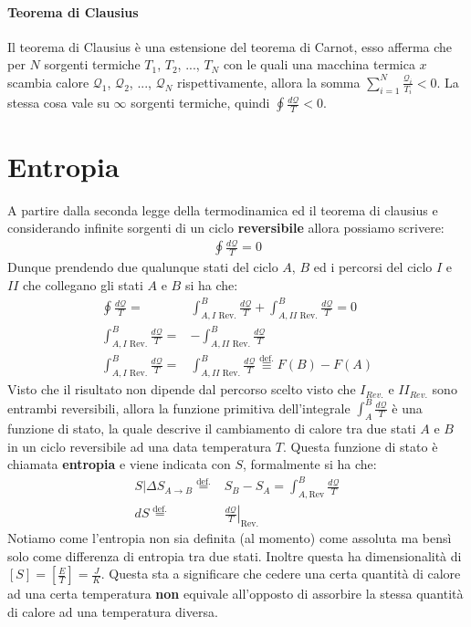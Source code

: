     \paragraph{Teorema di Clausius}
        Il teorema di Clausius è una estensione del teorema di Carnot, esso afferma che per $N$ sorgenti termiche $T_1$, $T_2$, ..., $T_N$ con le quali una macchina termica $x$ scambia calore $\mathcal{Q}_1$, $\mathcal{Q}_2$, ..., $\mathcal{Q}_N$ rispettivamente, allora la somma $\displaystyle\sum_{i=1}^N \frac{\mathcal{Q}_i}{T_i} < 0$. La stessa cosa vale su $\infty$ sorgenti termiche, quindi $\displaystyle\oint\frac{d\mathcal{Q}}{T} < 0$.
\section{Entropia}
    A partire dalla seconda legge della termodinamica ed il teorema di clausius e considerando infinite sorgenti di un ciclo \textbf{reversibile} allora possiamo scrivere:
    \begin{align*}
        \oint \frac{d\mathcal{Q}}T=0
    \end{align*}
    Dunque prendendo due qualunque stati del ciclo $A$, $B$ ed i percorsi del ciclo $I$ e $II$ che collegano gli stati $A$ e $B$ si ha che:
    \begin{align*}
        \oint \frac{d\mathcal{Q}}T =& \int_{A, I\text{ Rev.}}^B \frac{d\mathcal{Q}}T + \int_{A, II\text{ Rev.}}^B \frac{d\mathcal{Q}}T = 0\\
        \int_{A, I\text{ Rev.}}^B \frac{d\mathcal{Q}}T =& -\int_{A, II\text{ Rev.}}^B \frac{d\mathcal{Q}}T\\
        \int_{A, I\text{ Rev.}}^B \frac{d\mathcal{Q}}T =& \int_{A, II\text{ Rev.}}^B \frac{d\mathcal{Q}}T \stackrel{\text{def.}}{\equiv} F(B) - F(A)
    \end{align*}
    Visto che il risultato non dipende dal percorso scelto visto che $I_{Rev.}$ e $II_{Rev.}$ sono entrambi reversibili, allora la funzione primitiva dell'integrale $\int_{A}^{B} \frac{d\mathcal{Q}}T$ è una funzione di stato, la quale descrive il cambiamento di calore tra due stati $A$ e $B$ in un ciclo reversibile ad una data temperatura $T$. Questa funzione di stato è chiamata \textbf{entropia} e viene indicata con $S$, formalmente si ha che:
    \begin{align}
        S|\Delta S_{A\to B}\stackrel{\text{def.}}{=}&S_B - S_A = \int_{A, \text{Rev}}^{B} \frac{d\mathcal{Q}}T\\
        dS\stackrel{\text{def.}}{=}&\left.\frac{d\mathcal{Q}}T\right|_{\text{Rev.}}
    \end{align}
    Notiamo come l'entropia non sia definita (al momento) come assoluta ma bensì solo come differenza di entropia tra due stati. Inoltre questa ha dimensionalità di $[S] = \left[\frac{E}{T}\right] = \frac{J}{K}$. Questa sta a significare che cedere una certa quantità di calore ad una certa temperatura \textbf{non} equivale all'opposto di assorbire la stessa quantità di calore ad una temperatura diversa.
